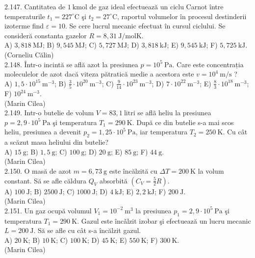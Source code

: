 2.147. Cantitatea de $1 \mathrm{~kmol}$ de gaz ideal efectuează un ciclu Carnot între temperaturile $t_{1}=227^{\circ} \mathrm{C}$ şi $t_{2}=27^{\circ} \mathrm{C}$, raportul volumelor în procesul destinderii izoterme find $\varepsilon=10$. Se cere lucrul mecanic efectuat în cursul ciclului. Se consideră constanta gazelor $R=8,31 \mathrm{~J} / \mathrm{mol} \mathrm{K}$.\\ A) $3,818 \mathrm{~MJ}$; B) $9,545 \mathrm{~MJ}$; C) $5,727 \mathrm{~MJ}$; D) $3,818 \mathrm{~kJ}$; E) $9,545 \mathrm{~kJ}$; F) $5,725 \mathrm{~kJ}$.\\ (Corneliu Călin)\\

2.148. Într-o incintă se află azot la presiunea $p=10^{5} \mathrm{~Pa}$. Care este concentrația moleculelor de azot dacă viteza pătratică medie a acestora este $v=10^{4} \mathrm{~m} / \mathrm{s}$ ?\\ A) $1,5 \cdot 10^{15} \mathrm{~m}^{-3}$; B) $\frac{3}{5} \cdot 10^{20} \mathrm{~m}^{-3}$; C) $\frac{9}{14} \cdot 10^{23} \mathrm{~m}^{-3}$; D) $7 \cdot 10^{22} \mathrm{~m}^{-3}$; E) $\frac{8}{3} \cdot 10^{18} \mathrm{~m}^{-3}$; F) $10^{24} \mathrm{~m}^{-3}$.\\ (Marin Cilea)\\

2.149. Intr-o butelie de volum $V=83,1 \mathrm{~litri}$ se aflã heliu la presiunea $p=2,9 \cdot 10^{5} \mathrm{~Pa}$ şi temperatura $T_{1}=290 \mathrm{~K}$. După ce din butelie s-a mai scos heliu, presiunea a devenit $p_{2}=1,25 \cdot 10^{5} \mathrm{~Pa}$, iar temperatura $T_{2}=250 \mathrm{~K}$. Cu cât a scăzut masa heliului din butelie?\\ A) $15 \mathrm{~g}$; B) $1,5 \mathrm{~g}$; C) $100 \mathrm{~g}$; D) $20 \mathrm{~g}$; E) $85 \mathrm{~g}$; F) $44 \mathrm{~g}$.\\ (Marin Cilea)\\

2.150. O masă de azot $m=6,73 \mathrm{~g}$ este încălzită cu $\Delta T=200 \mathrm{~K}$ la volum constant. Să se afle căldura $Q_{V}$ absorbită $\left(C_{V}=\frac{5}{2} R\right)$.\\ A) $100 \mathrm{~J}$; B) $2500 \mathrm{~J}$; C) $1000 \mathrm{~J}$; D) $4 \mathrm{~kJ}$; E) $2,2 \mathrm{~kJ}$; F) $200 \mathrm{~J}$.\\ (Marin Cilea)\\

2.151. Un gaz ocupă volumul $V_{1}=10^{-2} \mathrm{~m}^{3}$ la presiunea $p_{1}=2,9 \cdot 10^{5} \mathrm{~Pa}$ şi temperatura $T_{1}=290 \mathrm{~K}$. Gazul este încǎlzit izobar şi efectuează un lucru mecanic $L=200 \mathrm{~J}$. Să se afle cu cât s-a încălzit gazul.\\ A) $20 \mathrm{~K}$; B) $10 \mathrm{~K}$; C) $100 \mathrm{~K}$; D) $45 \mathrm{~K}$; E) $550 \mathrm{~K}$; F) $300 \mathrm{~K}$.\\ (Marin Cilea)\\

